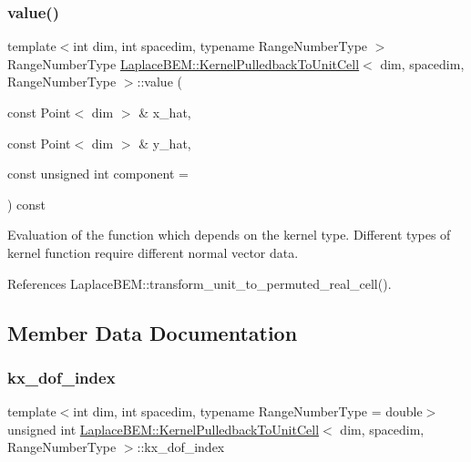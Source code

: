 \subsubsection{\texorpdfstring{value()}{value()}}
{\footnotesize\ttfamily template$<$int dim, int spacedim, typename Range\+Number\+Type $>$ \\
Range\+Number\+Type \hyperlink{classLaplaceBEM_1_1KernelPulledbackToUnitCell}{Laplace\+B\+E\+M\+::\+Kernel\+Pulledback\+To\+Unit\+Cell}$<$ dim, spacedim, Range\+Number\+Type $>$\+::value (\begin{DoxyParamCaption}\item[{const Point$<$ dim $>$ \&}]{x\+\_\+hat,  }\item[{const Point$<$ dim $>$ \&}]{y\+\_\+hat,  }\item[{const unsigned int}]{component = {} }\end{DoxyParamCaption}) const\hspace{0.3cm}{\ttfamily [virtual]}}

Evaluation of the function which depends on the kernel type. Different types of kernel function require different normal vector data. 

References Laplace\+B\+E\+M\+::transform\+\_\+unit\+\_\+to\+\_\+permuted\+\_\+real\+\_\+cell().



\subsection{Member Data Documentation}
\mbox{\label{classLaplaceBEM_1_1KernelPulledbackToUnitCell_a66ba57ad86025978e5e5580c822aef89}} 
\subsubsection{\texorpdfstring{kx\+\_\+dof\+\_\+index}{kx\_dof\_index}}
{\footnotesize\ttfamily template$<$int dim, int spacedim, typename Range\+Number\+Type = double$>$ \\
unsigned int \hyperlink{classLaplaceBEM_1_1KernelPulledbackToUnitCell}{Laplace\+B\+E\+M\+::\+Kernel\+Pulledback\+To\+Unit\+Cell}$<$ dim, spacedim, Range\+Number\+Type $>$\+::kx\+\_\+dof\+\_\+index\hspace{0.3cm}{\ttfamily [private]}}

